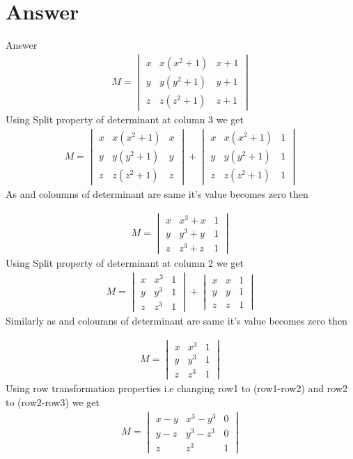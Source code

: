\documentclass{beamer}
\newcommand{\mydet}[1]{\ensuremath{\begin{vmatrix}#1\end{vmatrix}}}
\begin{document}
\section{Answer}
\begin{frame}{Answer}
    \begin{align}
    M = \mydet{x & x(x^2+1) & x+1\\y & y(y^2+1) & y+1\\z & z(z^2+1) & z+1}
    \end{align}
Using Split property of determinant at column 3 we get
    \begin{align}
        M = \mydet{x & x(x^2+1) & x\\y & y(y^2+1) & y\\z & z(z^2+1) & z}+ \mydet{x & x(x^2+1) & 1\\y & y(y^2+1) & 1\\z & z(z^2+1) & 1}
    \end{align}
As  and  coloumns of  determinant are same it's value becomes zero then
\end{frame}
\begin{frame}

    \begin{align}
    M = \mydet{x & x^3+x & 1\\y & y^3+y & 1\\z & z^3+z & 1}
    \end{align}
Using Split property of determinant at column 2 we get 
    \begin{align}
    M = \mydet{x & x^3 & 1\\y & y^3 & 1\\z & z^3 & 1}+\mydet{x & x & 1\\y & y & 1\\z & z & 1}
    \end{align}
    Similarly as  and  coloumns of  determinant are same it's value becomes zero then
\end{frame}
\begin{frame}
\begin{align}
     M = \mydet{x & x^3 & 1\\y & y^3 & 1\\z & z^3 & 1}
\end{align}
     Using row transformation properties i.e changing row1 to (row1-row2) and row2 to (row2-row3) we get
     \begin{align}
    M = \mydet{x-y & x^3-y^3 & 0\\y-z & y^3-z^3 & 0\\z & z^3 & 1}
     \end{align}
     \end{frame}
\end{document}
